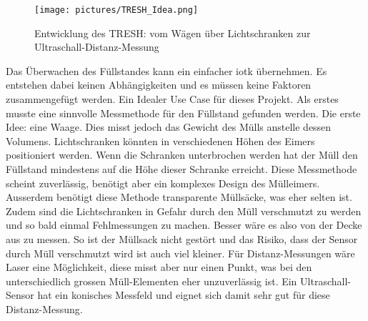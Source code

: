\begin{figure}[H]
     \centering
        \texttt{[image: pictures/TRESH\_Idea.png]}
    \caption{Entwicklung des TRESH: vom Wägen über Lichtschranken zur Ultraschall-Distanz-Messung}
    \label{fig:TRESH Idee}
\end{figure}
Das Überwachen des Füllstandes kann ein einfacher \gls{iotk} übernehmen. Es entstehen dabei keinen Abhängigkeiten und es müssen keine Faktoren zusammengefügt werden. Ein Idealer Use Case für dieses Projekt. Als erstes musste eine sinnvolle Messmethode für den Füllstand gefunden werden. Die erste Idee: eine Waage. Dies misst jedoch das Gewicht des Mülls anstelle dessen Volumens. Lichtschranken könnten in verschiedenen Höhen des Eimers positioniert werden. Wenn die Schranken unterbrochen werden hat der Müll den Füllstand mindestens auf die Höhe dieser Schranke erreicht. Diese Messmethode scheint zuverlässig, benötigt aber ein komplexes Design des Mülleimers. Ausserdem benötigt diese Methode transparente Müllsäcke, was eher selten ist. Zudem sind die Lichtschranken in Gefahr durch den Müll verschmutzt zu werden und so bald einmal Fehlmessungen zu machen. Besser wäre es also von der Decke aus zu messen. So ist der Müllsack nicht gestört und das Risiko, dass der Sensor durch Müll verschmutzt wird ist auch viel kleiner. Für Distanz-Messungen wäre Laser eine Möglichkeit, diese misst aber nur einen Punkt, was bei den unterschiedlich grossen Müll-Elementen eher unzuverlässig ist. Ein Ultraschall-Sensor hat ein konisches Messfeld und eignet sich damit sehr gut für diese Distanz-Messung. 

